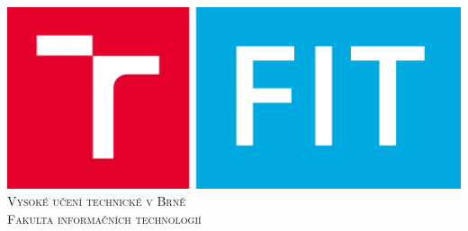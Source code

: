 \documentclass[pdftex, 11pt, a4paper, titlepage]{article}
\begin{document}
    \begin{titlepage}
        \includegraphics[scale=0.2]{FIT_logo.png}\\
        \Huge
        \textsc{Vysoké učení technické v Brně\\
                Fakulta informačních technologií}\\
        
    \end{titlepage}
\end{document}
